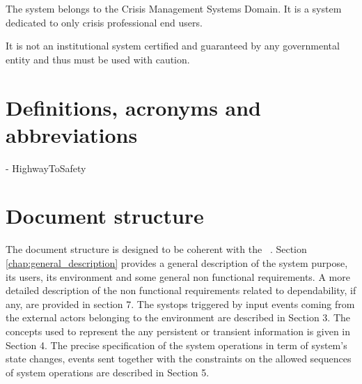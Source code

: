 The  system belongs to the Crisis Management Systems Domain. It is a
system dedicated to only crisis professional end users.

It is not an institutional system certified and guaranteed by any governmental
entity and thus must be used with caution. 
\section{Definitions, acronyms and abbreviations}
 - HighwayToSafety

\section{Document structure} 
The document structure is designed to be coherent with the
\msrmessirmeth~\cite{messirbook}. Section \ref{chap:general_description} provides a general
description of the system purpose, its users, its environment and some general
non functional requirements. A more detailed description of the non functional
requirements related to dependability, if any, are provided in section 7.
The \glspl{systop} triggered by input events coming from the external
\glspl{actor} belonging to the environment are described in Section 3.
The  concepts used to represent the any persistent or transient
information is given in Section 4. The precise specification of the system
operations in term of system's state changes, events sent together with the
constraints on the allowed sequences of system operations are described in
Section 5.
